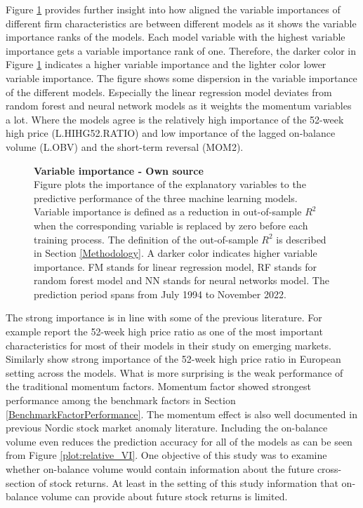 \documentclass[12pt]{article}
\begin{document}
Figure \ref{plot:combined_VI} provides further insight into how aligned the variable importances of different firm characteristics are between different models as it shows the variable importance ranks of the models. Each model variable with the highest variable importance gets a variable importance rank of one. Therefore, the darker color in Figure \ref{plot:combined_VI} indicates a higher variable importance and the lighter color lower variable importance. The figure shows some dispersion in the variable importance of the different models. Especially the linear regression model deviates from random forest and neural network models as it weights the momentum variables a lot. Where the models agree is the relatively high importance of the 52-week high price (L.HIHG52.RATIO) and low importance of the lagged on-balance volume (L.OBV) and the short-term reversal (MOM2). \par

\begin{figure}[ht]
\centering
\caption[Variable importance]{\textbf{Variable importance \textnormal{- Own source}}\\ Figure plots the importance of the explanatory variables to the predictive performance of the three machine learning models. Variable importance is defined as a reduction in out-of-sample $R^2$ when the corresponding variable is replaced by zero before each training process. The definition of the out-of-sample $R^2$ is described in Section \ref{Methodology}. A darker color indicates higher variable importance. FM stands for linear regression model, RF stands for random forest model and NN stands for neural networks model. The prediction period spans from July 1994 to November 2022.}

\label{plot:combined_VI}
\end{figure}

The strong importance is in line with some of the previous literature. For example \citet{HANAUER2023} report the 52-week high price ratio as one of the most important characteristics for most of their models in their study on emerging markets. Similarly \citet{TOBEK2021100588} show strong importance of the 52-week high price ratio in European setting across the models.\footnotemark {} What is more surprising is the weak performance of the traditional momentum factors. Momentum factor showed strongest performance among the benchmark factors in Section \ref{BenchmarkFactorPerformance}. The momentum effect is also well documented in previous Nordic stock market anomaly literature.\footnotemark {} Including the on-balance volume even reduces the prediction accuracy for all of the models as can be seen from Figure \ref{plot:relative_VI}. One objective of this study was to examine whether on-balance volume would contain information about the future cross-section of stock returns. At least in the setting of this study information that on-balance volume can provide about future stock returns is limited. \par
\end{document}
